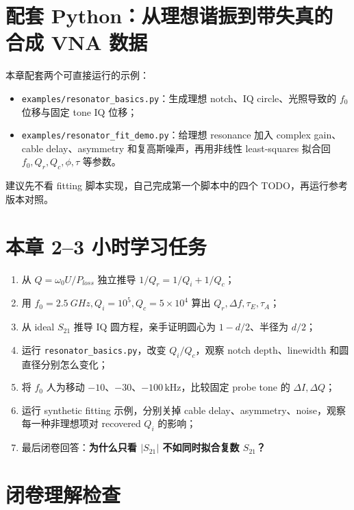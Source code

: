 \documentclass[11pt,a4paper,openany]{ctexrep}
\begin{document}
\section{配套 Python：从理想谐振到带失真的合成 VNA 数据}

本章配套两个可直接运行的示例：
\begin{itemize}
  \item \texttt{examples/resonator\_basics.py}：生成理想 notch、IQ circle、光照导致的 $f_0$ 位移与固定 tone IQ 位移；
  \item \texttt{examples/resonator\_fit\_demo.py}：给理想 resonance 加入 complex gain、cable delay、asymmetry 和复高斯噪声，再用非线性 least-squares 拟合回 $f_0,Q_r,Q_c,\phi,\tau$ 等参数。
\end{itemize}

建议先不看 fitting 脚本实现，自己完成第一个脚本中的四个 TODO，再运行参考版本对照。

\section{本章 2--3 小时学习任务}

\begin{enumerate}
  \item 从 $Q=\omega_0U/P_{loss}$ 独立推导 $1/Q_r=1/Q_i+1/Q_c$；
  \item 用 $f_0=\SI{2.5}{GHz},Q_i=10^5,Q_c=5\times10^4$ 算出 $Q_r,\Delta f,\tau_E,\tau_A$；
  \item 从 ideal $S_{21}$ 推导 IQ 圆方程，亲手证明圆心为 $1-d/2$、半径为 $d/2$；
  \item 运行 \texttt{resonator\_basics.py}，改变 $Q_i/Q_c$，观察 notch depth、linewidth 和圆直径分别怎么变化；
  \item 将 $f_0$ 人为移动 $-10$、$-30$、$-100\,\mathrm{kHz}$，比较固定 probe tone 的 $\Delta I,\Delta Q$；
  \item 运行 synthetic fitting 示例，分别关掉 cable delay、asymmetry、noise，观察每一种非理想项对 recovered $Q_i$ 的影响；
  \item 最后闭卷回答：\textbf{为什么只看 $|S_{21}|$ 不如同时拟合复数 $S_{21}$？}
\end{enumerate}

\section{闭卷理解检查}
\end{document}
